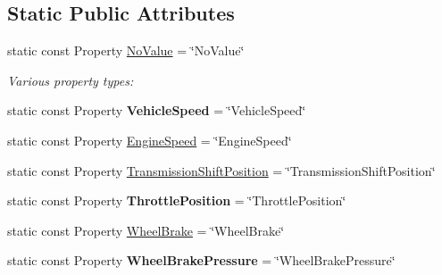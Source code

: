 \subsection*{Static Public Attributes}
\begin{DoxyCompactItemize}
\item 
static const Property \hyperlink{classVehicleProperty_ae013e9c1f3fb57d646211d3e6bb4ca9e}{No\+Value} = \char`\"{}No\+Value\char`\"{}
\begin{DoxyCompactList}\small\item\em Various property types\+: \end{DoxyCompactList}\item 
\hypertarget{classVehicleProperty_af457ed63f945a7f6b4e074f3ba8b904f}{static const Property {\bfseries Vehicle\+Speed} = \char`\"{}Vehicle\+Speed\char`\"{}}\label{classVehicleProperty_af457ed63f945a7f6b4e074f3ba8b904f}

\item 
static const Property \hyperlink{classVehicleProperty_a7949fe3d031814fc2644de14f8cec9a0}{Engine\+Speed} = \char`\"{}Engine\+Speed\char`\"{}
\item 
static const Property \hyperlink{classVehicleProperty_ae486d9ea26918460822086b797018800}{Transmission\+Shift\+Position} = \char`\"{}Transmission\+Shift\+Position\char`\"{}
\item 
\hypertarget{classVehicleProperty_a0ac93e18603ccf0ebf214b2712785100}{static const Property {\bfseries Throttle\+Position} = \char`\"{}Throttle\+Position\char`\"{}}\label{classVehicleProperty_a0ac93e18603ccf0ebf214b2712785100}

\item 
static const Property \hyperlink{classVehicleProperty_ad4f1ec038bee5ef30fbf8308aaba2794}{Wheel\+Brake} = \char`\"{}Wheel\+Brake\char`\"{}
\item 
\hypertarget{classVehicleProperty_a617cc19f62d99f7f72a047d5066dcd96}{static const Property {\bfseries Wheel\+Brake\+Pressure} = \char`\"{}Wheel\+Brake\+Pressure\char`\"{}}\label{classVehicleProperty_a617cc19f62d99f7f72a047d5066dcd96}


\end{DoxyCompactItemize}
